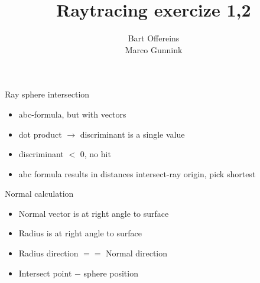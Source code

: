 \documentclass{beamer}
\author{Bart Offereins\\Marco Gunnink}
\title{Raytracing exercize 1,2}
\begin{document}
\titlepage

\begin{frame}{Ray sphere intersection}

\begin{itemize}
  \item abc-formula, but with vectors
  \item dot product $\rightarrow$ discriminant is a single value
  \item discriminant $<$ 0, no hit
  \item abc formula results in distances intersect-ray origin, pick shortest
\end{itemize}

\end{frame}

\begin{frame}{Normal calculation}

\begin{itemize}
  \item Normal vector is at right angle to surface
  \item Radius is at right angle to surface
  \item Radius direction $==$ Normal direction 
  \item Intersect point $-$ sphere position
\end{itemize}

\end{frame}
\end{document}
